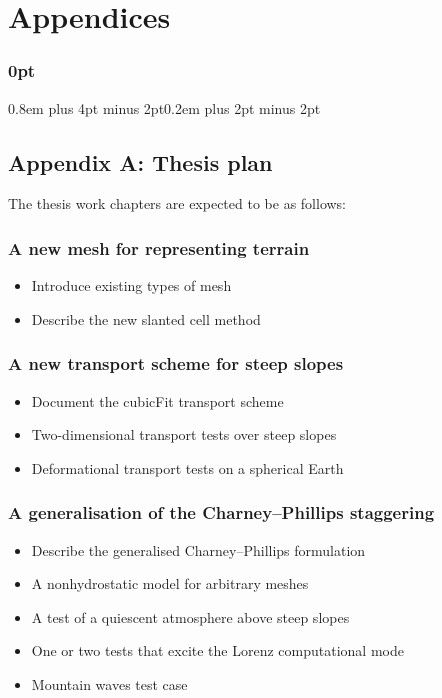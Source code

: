 \documentclass[a4paper,11pt]{article}
\begin{document}
                                                 


\newpage

\section*{Appendices}

\titlespacing\subsubsection{0pt}{0.8em plus 4pt minus 2pt}{0.2em plus 2pt minus 2pt}

\subsection*{Appendix A: Thesis plan}
The thesis work chapters are expected to be as follows:

\subsubsection*{A new mesh for representing terrain}
\begin{itemize}
	\setlength\itemsep{0.1em}
	\item Introduce existing types of mesh
	\item Describe the new slanted cell method
\end{itemize}

\subsubsection*{A new transport scheme for steep slopes}
\begin{itemize}
	\setlength\itemsep{0.1em}
	\item Document the cubicFit transport scheme
	\item Two-dimensional transport tests over steep slopes
	\item Deformational transport tests on a spherical Earth
\end{itemize}
	
\subsubsection*{A generalisation of the Charney--Phillips staggering}
\begin{itemize}
	\setlength\itemsep{0.1em}
	\item Describe the generalised Charney--Phillips formulation
	\item A nonhydrostatic model for arbitrary meshes
	\item A test of a quiescent atmosphere above steep slopes
	\item One or two tests that excite the Lorenz computational mode
	\item Mountain waves test case
\end{itemize}
\end{document}
